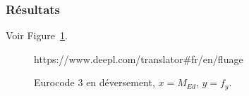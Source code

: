 \documentclass{report}
\begin{document}
\subsubsection{Résultats}
Voir Figure~\ref{fig:m1}.

\begin{figure}[!ht]https://www.deepl.com/translator#fr/en/fluage
    \centering
    
    \caption{Eurocode 3 en déversement, $x=M_{Ed}$, $y=f_y$.}\label{fig:m1}
\end{figure}

\listoffigures

\nocite{*}
\printbibliography
\end{document}
